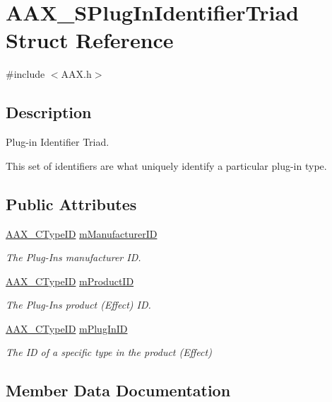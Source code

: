 \hypertarget{a00127}{}\section{A\+A\+X\+\_\+\+S\+Plug\+In\+Identifier\+Triad Struct Reference}
\label{a00127}


{\ttfamily \#include $<$A\+A\+X.\+h$>$}



\subsection{Description}
Plug-\/in Identifier Triad. 

This set of identifiers are what uniquely identify a particular plug-\/in type. \subsection*{Public Attributes}
\begin{DoxyCompactItemize}
\item 
\hyperlink{a00149_ac678f9c1fbcc26315d209f71a147a175}{A\+A\+X\+\_\+\+C\+Type\+I\+D} \hyperlink{a00127_a996b416626b2bb8bec10294b63579d91}{m\+Manufacturer\+I\+D}
\begin{DoxyCompactList}\small\item\em The Plug-\/\+In\textquotesingle{}s manufacturer I\+D. \end{DoxyCompactList}\item 
\hyperlink{a00149_ac678f9c1fbcc26315d209f71a147a175}{A\+A\+X\+\_\+\+C\+Type\+I\+D} \hyperlink{a00127_a68e6bc6c424a7eabe04d52fe47c2a006}{m\+Product\+I\+D}
\begin{DoxyCompactList}\small\item\em The Plug-\/\+In\textquotesingle{}s product (Effect) I\+D. \end{DoxyCompactList}\item 
\hyperlink{a00149_ac678f9c1fbcc26315d209f71a147a175}{A\+A\+X\+\_\+\+C\+Type\+I\+D} \hyperlink{a00127_a7554a514df9e97e8a7c8e416165f2f59}{m\+Plug\+In\+I\+D}
\begin{DoxyCompactList}\small\item\em The I\+D of a specific type in the product (Effect) \end{DoxyCompactList}\end{DoxyCompactItemize}


\subsection{Member Data Documentation}
\hypertarget{a00127_a996b416626b2bb8bec10294b63579d91}{}
